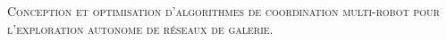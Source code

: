 \documentclass{article}
\numberwithin{figure}{section}
\numberwithin{table}{section}
\begin{document}
\begin{titlepage}
    \begin{center}
        \Large
        \vfill
        \textsc{Conception et optimisation d'algorithmes de coordination multi-robot pour l'exploration autonome de réseaux de galerie.}
        \vfill
    \end{center}
\end{titlepage}
\newpage



\newpage



\newpage




\newpage
{}

\footnotesize{}
\end{document}
